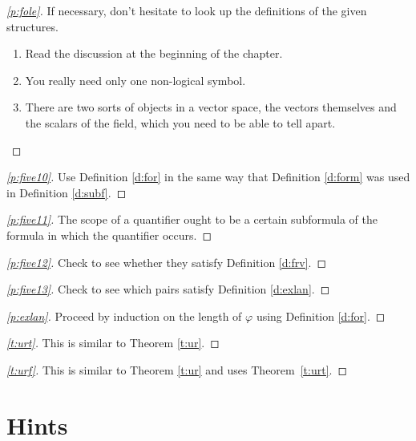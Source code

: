 \documentclass[12pt]{amsbook}
\theoremstyle{plain}
\theoremstyle{definition}
\theoremstyle{remark}
\newenvironment{clue}[1]%
{\begin{proof}[\ref{#1}]}%
{\renewcommand{\qed}{}\end{proof}}
\begin{document}
\begin{clue}{p:fole}
If necessary,  don't hesitate to look up the definitions of the given structures.
\begin{enumerate}
\item Read the discussion at the beginning of the chapter.
\item You really need only one non-logical symbol.
\item There are two sorts of objects in a vector space,  the vectors themselves and the scalars of the field,  which you need to be able to tell apart.
\end{enumerate}
\end{clue}

\begin{clue}{p:five10}
Use Definition \ref{d:for} in the same way that Definition \ref{d:form} was used in Definition \ref{d:subf}.  
\end{clue}

\begin{clue}{p:five11}
The scope of a quantifier ought to be a certain subformula of the formula in which the quantifier occurs.
\end{clue}

\begin{clue}{p:five12}
Check to see whether they satisfy Definition \ref{d:frv}.
\end{clue}

\begin{clue}{p:five13}
Check to see which pairs satisfy Definition \ref{d:exlan}.
\end{clue}

\begin{clue}{p:exlan}
Proceed by induction on the length of $\varphi$ using Definition \ref{d:for}.
\end{clue}

\begin{clue}{t:urt}
This is similar to Theorem \ref{t:ur}.
\end{clue}

\begin{clue}{t:urf}
This is similar to Theorem \ref{t:ur} and uses Theorem~\ref{t:urt}.
\end{clue}



%
%

\chapter{Hints}
\end{document}
